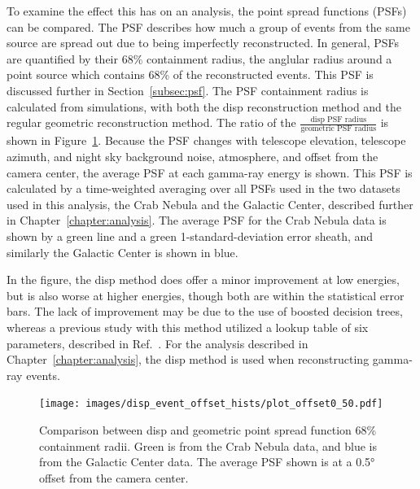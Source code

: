     To examine the effect this has on an analysis, the point spread functions (PSFs) can be compared.
    The PSF describes how much a group of events from the same source are spread out due to being imperfectly reconstructed.
    In general, PSFs are quantified by their 68\% containment radius, the anglular radius around a point source  which contains 68\% of the reconstructed events.
    This PSF is discussed further in Section~\ref{subsec:psf}.
    The PSF containment radius is calculated from simulations, with both the disp reconstruction method and the regular geometric reconstruction method.
    The ratio of the $\frac{\textrm{disp PSF radius}}{\textrm{geometric PSF radius}}$ is shown in Figure~\ref{fig:disp_psf_comparison}.
    Because the PSF changes with telescope elevation, telescope azimuth, and night sky background noise, atmosphere, and offset from the camera center, the average PSF at each gamma-ray energy is shown.
    This PSF is calculated by a time-weighted averaging over all PSFs used in the two datasets used in this analysis, the Crab Nebula and the Galactic Center, described further in Chapter~\ref{chapter:analysis}.
    The average PSF for the Crab Nebula data is shown by a green line and a green 1-standard-deviation error sheath, and similarly the Galactic Center is shown in blue.
    
    In the figure, the disp method does offer a minor improvement at low energies, but is also worse at higher energies, though both are within the statistical error bars.
    The lack of improvement may be due to the use of boosted decision trees, whereas a previous study with this method utilized a lookup table of six parameters, described in Ref.~\cite{Beilicke2012NIM}.
    For the analysis described in Chapter~\ref{chapter:analysis}, the disp method is used when reconstructing gamma-ray events.
    
    \begin{figure}[b]
      \centering
      \texttt{[image: images/disp\_event\_offset\_hists/plot\_offset0\_50.pdf]}
      \caption[DISP Point Spread Function Comparison]{
        Comparison between disp and geometric point spread function 68\% containment radii.
        Green is from the Crab Nebula data, and blue is from the Galactic Center data.
        The average PSF shown is at a \ang{0.5} offset from the camera center.
      }
      \label{fig:disp_psf_comparison}
    \end{figure}
  
  \FloatBarrier

